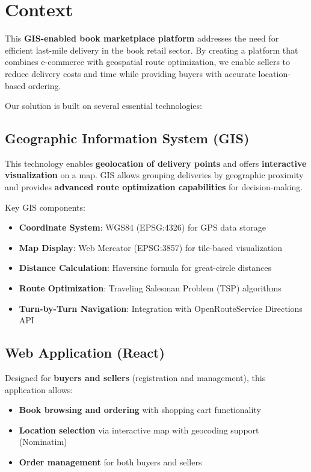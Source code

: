 \documentclass[12pt,a4paper]{article}
\begin{document}
\newpage

\section{Context}

This \textbf{GIS-enabled book marketplace platform} addresses the need for efficient last-mile delivery in the book retail sector. By creating a platform that combines e-commerce with geospatial route optimization, we enable sellers to reduce delivery costs and time while providing buyers with accurate location-based ordering.

Our solution is built on several essential technologies:

\subsection{Geographic Information System (GIS)}

This technology enables \textbf{geolocation of delivery points} and offers \textbf{interactive visualization} on a map. GIS allows grouping deliveries by geographic proximity and provides \textbf{advanced route optimization capabilities} for decision-making.

Key GIS components:
\begin{itemize}
    \item \textbf{Coordinate System}: WGS84 (EPSG:4326) for GPS data storage
    \item \textbf{Map Display}: Web Mercator (EPSG:3857) for tile-based visualization
    \item \textbf{Distance Calculation}: Haversine formula for great-circle distances
    \item \textbf{Route Optimization}: Traveling Salesman Problem (TSP) algorithms
    \item \textbf{Turn-by-Turn Navigation}: Integration with OpenRouteService Directions API
\end{itemize}

\subsection{Web Application (React)}

Designed for \textbf{buyers and sellers} (registration and management), this application allows:
\begin{itemize}
    \item \textbf{Book browsing and ordering} with shopping cart functionality
    \item \textbf{Location selection} via interactive map with geocoding support (Nominatim)
    \item \textbf{Order management} for both buyers and sellers
\end{itemize}
\end{document}
